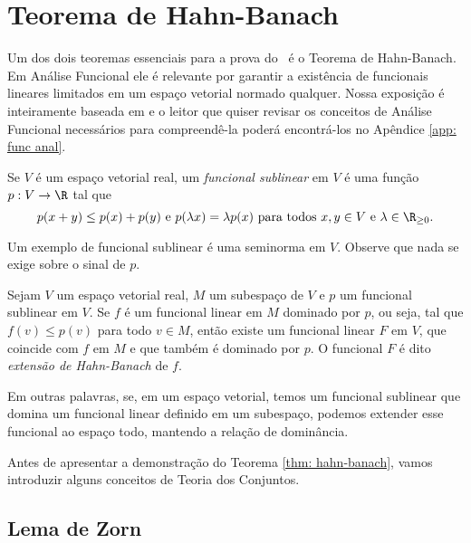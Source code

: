 \section{Teorema de Hahn-Banach}

Um dos dois teoremas essenciais para a prova do \uat \ é o Teorema de Hahn-Banach.
Em Análise Funcional ele é relevante por garantir a existência de funcionais lineares limitados em um espaço vetorial normado qualquer.
Nossa exposição é inteiramente baseada em \cite{func-anal} e o leitor que quiser revisar os conceitos de Análise Funcional necessários para compreendê-la poderá encontrá-los no Apêndice \ref{app: func anal}.

\begin{defn}
    Se \( V \) é um espaço vetorial real, um \emph{funcional sublinear} em \( V \) é uma função \( p : V \to \R \) tal que \[
        p ( x + y ) \leq p(x) + p(y) \text{ e } p(\lambda x) = \lambda p(x) \text{ para todos \( x, y \in V \) e \( \lambda \in \R_{ \geq 0 } \)}
    .\]
\end{defn}

Um exemplo de funcional sublinear é uma seminorma em \( V \).
Observe que nada se exige sobre o sinal de \( p \).

\begin{teo}
    \label{thm: hahn-banach}
    Sejam \( V \) um espaço vetorial real, \( M \) um subespaço de \( V \) e \( p \) um funcional sublinear em \( V \).
    Se \( f \) é um funcional linear em \( M \) dominado por \( p \), ou seja, tal que \( f(v) \leq p(v) \) para todo \( v \in M \), então existe um funcional linear \( F \) em \( V \), que coincide com \( f \) em \( M \) e que também é dominado por \( p \).
    O funcional \( F \) é dito \emph{extensão de Hahn-Banach} de \( f \).
\end{teo}

Em outras palavras, se, em um espaço vetorial, temos um funcional sublinear que domina um funcional linear definido em um subespaço, podemos extender esse funcional ao espaço todo, mantendo a relação de dominância.

Antes de apresentar a demonstração do Teorema \ref{thm: hahn-banach}, vamos introduzir alguns conceitos de Teoria dos Conjuntos.


\subsection{Lema de Zorn}


